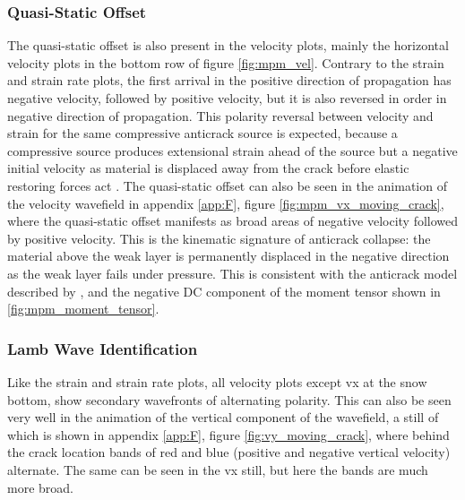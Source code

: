 \subsubsection{Quasi-Static Offset}
The quasi-static offset is also present in the velocity plots, mainly the horizontal velocity plots in the bottom row of figure \ref{fig:mpm_vel}. Contrary to the strain and strain rate plots, the first arrival in the positive direction of propagation has negative velocity, followed by positive velocity, but it is also reversed in order in negative direction of propagation. This polarity reversal between velocity and strain for the same compressive anticrack source is expected, because a compressive source produces extensional strain ahead of the source but a negative initial velocity as material is displaced away from the crack before elastic restoring forces act \parencite{kAkiRichards19801981}. The quasi-static offset can also be seen in the animation of the velocity wavefield in appendix \ref{app:F}, figure \ref{fig:mpm_vx_moving_crack}, where the quasi-static offset manifests as broad areas of negative velocity followed by positive velocity. This is the kinematic signature of anticrack collapse: the material above the weak layer is permanently displaced in the negative direction as the weak layer fails under pressure. This is consistent with the anticrack model described by \cite{mcclungFractureMechanicalModels1981}, and the negative DC component of the moment tensor shown in \ref{fig:mpm_moment_tensor}. 

\subsubsection{Lamb Wave Identification}

Like the strain and strain rate plots, all velocity plots except vx at the snow bottom, show secondary wavefronts of alternating polarity. This can also be seen very well in the animation of the vertical component of the wavefield, a still of which is shown in appendix \ref{app:F}, figure \ref{fig:vy_moving_crack}, where behind the crack location bands of red and blue (positive and negative vertical velocity) alternate. The same can be seen in the vx still, but here the bands are much more broad. \par


